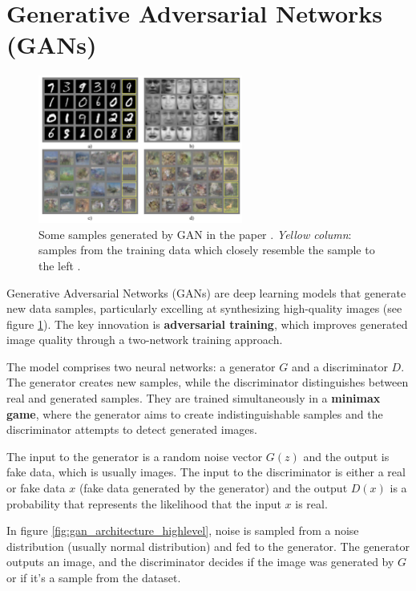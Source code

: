 \section{Generative Adversarial Networks (GANs)}
\label{sec:gan}

\begin{figure}
    \centering
    \includegraphics[width=0.6\textwidth]{images/gan/gan_samples.png}
    \caption{Some samples generated by GAN in the paper \cite{gan}. \textit{Yellow column}: samples from the training data which closely resemble the sample to the left \cite{gan}.}
    \label{fig:gan_samples}
\end{figure}

Generative Adversarial Networks (GANs) \cite{gan} are deep learning models that generate new data samples, particularly excelling at synthesizing high-quality images (see figure \ref{fig:gan_samples}). The key innovation is \textbf{adversarial training}, which improves generated image quality through a two-network training approach.

The model comprises two neural networks: a generator $G$ and a discriminator $D$. The generator creates new samples, while the discriminator distinguishes between real and generated samples. They are trained simultaneously in a \textbf{minimax game}, where the generator aims to create indistinguishable samples and the discriminator attempts to detect generated images. 

The input to the generator is a random noise vector $G(z)$ and the output is fake data, which is usually images. The input to the discriminator is either a real or fake data $x$ (fake data generated by the generator) and the output $D(x)$ is a probability that represents the likelihood that the input $x$ is real.



In figure \ref{fig:gan_architecture_highlevel}, noise is sampled from a noise distribution (usually normal distribution) and fed to the generator. The generator outputs an image, and the discriminator decides if the image was generated by $G$ or if it's a sample from the dataset.

